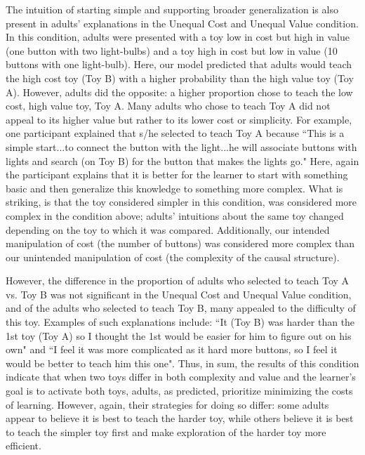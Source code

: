 \documentclass[10pt,letterpaper]{article}
\begin{document}
The intuition of starting simple and supporting broader generalization is also present in adults' explanations in the Unequal Cost and Unequal Value condition. In this condition, adults were presented with a toy low in cost but high in value (one button with two light-bulbs) and a toy high in cost but low in value (10 buttons with one light-bulb). Here, our model predicted that adults would teach the high cost toy (Toy B) with a higher probability than the high value toy (Toy A). However, adults did the opposite: a higher proportion chose to teach the low cost, high value toy, Toy A. Many adults who chose to teach Toy A did not appeal to its higher value but rather to its lower cost or simplicity. For example, one participant explained that s/he selected to teach Toy A because ``This is a simple start...to connect the button with the light...he will associate buttons with lights and search (on Toy B) for the button that makes the lights go." Here, again the participant explains that it is better for the learner to start with something basic and then generalize this knowledge to something more complex. What is striking, is that the toy considered simpler in this condition, was considered more complex in the condition above; adults' intuitions about the same toy changed depending on the toy to which it was compared. Additionally, our intended manipulation of cost (the number of buttons) was considered more complex than our unintended manipulation of cost (the complexity of the causal structure). 

However, the difference in the proportion of adults who selected to teach Toy A vs. Toy B was not significant in the Unequal Cost and Unequal Value condition, and of the adults who selected to teach Toy B, many appealed to the difficulty of this toy. Examples of such explanations include: ``It (Toy B) was harder than the 1st toy (Toy A) so I thought the 1st would be easier for him to figure out on his own" and ``I feel it was more complicated as it hard more buttons, so I feel it would be better to teach him this one". Thus, in sum, the results of this condition indicate that when two toys differ in both complexity and value and the learner's goal is to activate both toys, adults, as predicted, prioritize minimizing the costs of learning. However, again, their strategies for doing so differ: some adults appear to believe it is best to teach the harder toy, while others believe it is best to teach the simpler toy first and make exploration of the harder toy more efficient. 
\end{document}
